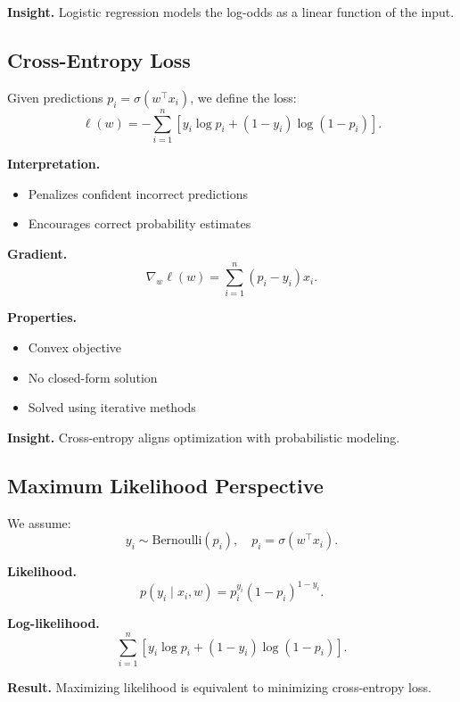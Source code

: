 \noindent
\textbf{Insight.}  
Logistic regression models the log-odds as a linear function of the input.

\subsection{Cross-Entropy Loss}

Given predictions $p_i = \sigma(w^\top x_i)$, we define the loss:
\[
\ell(w) = - \sum_{i=1}^n \left[
y_i \log p_i + (1 - y_i)\log(1 - p_i)
\right].
\]

\medskip

\noindent
\textbf{Interpretation.}
\begin{itemize}
    \item Penalizes confident incorrect predictions
    \item Encourages correct probability estimates
\end{itemize}

\medskip

\noindent
\textbf{Gradient.}
\[
\nabla_w \ell(w) = \sum_{i=1}^n (p_i - y_i)x_i.
\]

\medskip

\noindent
\textbf{Properties.}
\begin{itemize}
    \item Convex objective
    \item No closed-form solution
    \item Solved using iterative methods
\end{itemize}

\medskip

\noindent
\textbf{Insight.}  
Cross-entropy aligns optimization with probabilistic modeling.

\subsection{Maximum Likelihood Perspective}

We assume:
\[
y_i \sim \text{Bernoulli}(p_i), \quad p_i = \sigma(w^\top x_i).
\]

\medskip

\noindent
\textbf{Likelihood.}
\[
p(y_i \mid x_i, w) = p_i^{y_i}(1 - p_i)^{1 - y_i}.
\]

\medskip

\noindent
\textbf{Log-likelihood.}
\[
\sum_{i=1}^n \left[
y_i \log p_i + (1 - y_i)\log(1 - p_i)
\right].
\]

\medskip

\noindent
\textbf{Result.}  
Maximizing likelihood is equivalent to minimizing cross-entropy loss.

